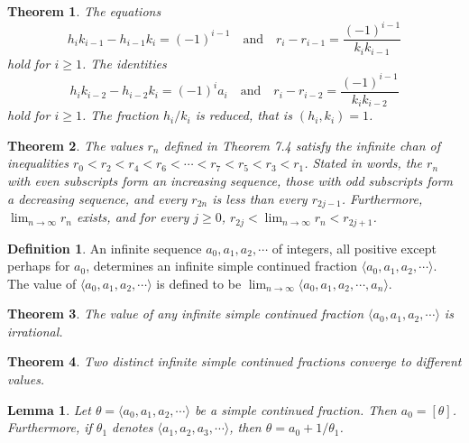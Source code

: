 \documentclass{amsart}
\newtheorem{theorem}{Theorem}
\newtheorem{lemma}{Lemma}
\theoremstyle{definition}
\newtheorem*{definition*}{Definition}
\begin{document}
\begin{theorem}
  The equations
  \[
    h_i k_{i-1} - h_{i-1} k_i = (-1)^{i-1}
    \quad
    \text{and}
    \quad
    r_i - r_{i-1} = \frac{(-1)^{i-1}}{k_i k_{i-1}}
  \]
  hold for $i \geq 1$.
  The identities 
  \[
    h_i k_{i-2} - h_{i-2} k_i = (-1)^{i} a_i
    \quad
    \text{and}
    \quad
    r_i - r_{i-2} = \frac{(-1)^{i-1}}{k_i k_{i-2}}
  \]
  hold for $i \geq 1$.
  The fraction $h_i / k_i$ is reduced, that is
  $(h_i, k_i) = 1$.
\end{theorem}

\begin{theorem}
  The values $r_n$ defined in Theorem 7.4 satisfy
  the infinite chan of inequalities
  $r_0 < r_2 < r_4 < r_6 < \cdots < r_7 < r_5 < r_3 < r_1$.
  Stated in words, the $r_n$ with even subscripts form an 
  increasing sequence, those with odd subscripts form a decreasing
  sequence, and every $r_{2n}$ is less than every
  $r_{2j-1}$.
  Furthermore, $\lim_{n \to \infty} r_n$ exists, and
  for every $j \geq 0$, $r_{2j} < \lim_{n \to \infty} r_n < r_{2j+1}$.
\end{theorem}

\begin{definition*}
  An infinite sequence 
  $a_0, a_1, a_2, \cdots$
  of integers, all positive except perhaps for $a_0$, determines
  an infinite simple continued fraction 
  $\langle a_0, a_1, a_2, \cdots \rangle$.
  The value of 
  $\langle a_0, a_1, a_2, \cdots \rangle$
  is defined to be 
  $\lim_{n \to \infty} \langle a_0, a_1, a_2, \cdots, a_n \rangle$.
\end{definition*}

\begin{theorem}
  The value of any infinite simple continued fraction
  $\langle a_0, a_1, a_2, \cdots \rangle$ is irrational.
\end{theorem}

\begin{theorem}
  Two distinct infinite simple continued fractions converge to different
  values.
\end{theorem}

\begin{lemma}
  Let $\theta = \langle a_0, a_1, a_2, \cdots \rangle$
  be a simple continued fraction.
  Then $a_0 = [\theta]$.
  Furthermore, if $\theta_1$ denotes
  $\langle a_1, a_2, a_3, \cdots \rangle$, then
  $\theta = a_0 + 1 / \theta_1$.
\end{lemma}
\end{document}
